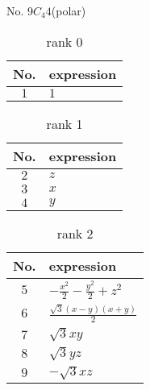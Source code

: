 \documentclass[fleqn,8pt,landscape]{jsarticle}
\begin{document}
\setcounter{MaxMatrixCols}{16}

\begin{center}
\LARGE
No. 9\quad$C_{4}$\quad$4$\quad[ tetragonal ] (polar)
\end{center}
\begin{table}[ht!]
\begin{center}
\caption{rank 0}
\renewcommand{\arraystretch}{1.3}
\begin{tabular}{cl} \hline \hline
No. & expression \\ \hline
$ 1 $ & $ 1 $ \\
 \hline \hline
\end{tabular}
\end{center}
\end{table}
\begin{table}[ht!]
\begin{center}
\caption{rank 1}
\renewcommand{\arraystretch}{1.3}
\begin{tabular}{cl} \hline \hline
No. & expression \\ \hline
$ 2 $ & $ z $ \\
$ 3 $ & $ x $ \\
$ 4 $ & $ y $ \\
 \hline \hline
\end{tabular}
\end{center}
\end{table}
\begin{table}[ht!]
\begin{center}
\caption{rank 2}
\renewcommand{\arraystretch}{1.3}
\begin{tabular}{cl} \hline \hline
No. & expression \\ \hline
$ 5 $ & $ - \frac{x^{2}}{2} - \frac{y^{2}}{2} + z^{2} $ \\
$ 6 $ & $ \frac{\sqrt{3} \left(x - y\right) \left(x + y\right)}{2} $ \\
$ 7 $ & $ \sqrt{3} x y $ \\
$ 8 $ & $ \sqrt{3} y z $ \\
$ 9 $ & $ - \sqrt{3} x z $ \\
 \hline \hline
\end{tabular}
\end{center}
\end{table}
\end{document}
